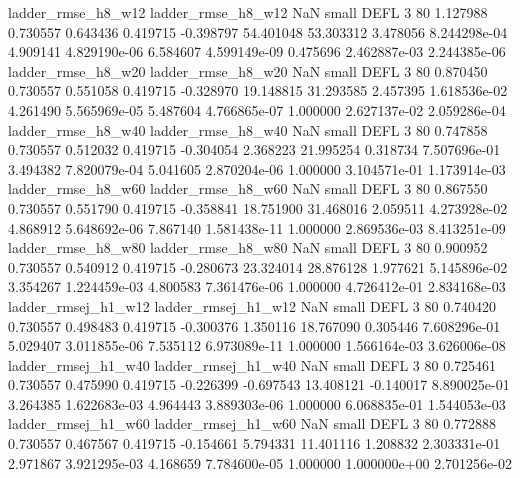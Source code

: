       ladder_rmse_h8_w12       ladder_rmse_h8_w12                   NaN      small     DEFL                 3 80 1.127988       0.730557 0.643436       0.419715   -0.398797     54.401048     53.303312     3.478056   8.244298e-04  4.909141 4.829190e-06     6.584607   4.599149e-09            0.475696    2.462887e-03        2.244385e-06
      ladder_rmse_h8_w20       ladder_rmse_h8_w20                   NaN      small     DEFL                 3 80 0.870450       0.730557 0.551058       0.419715   -0.328970     19.148815     31.293585     2.457395   1.618536e-02  4.261490 5.565969e-05     5.487604   4.766865e-07            1.000000    2.627137e-02        2.059286e-04
      ladder_rmse_h8_w40       ladder_rmse_h8_w40                   NaN      small     DEFL                 3 80 0.747858       0.730557 0.512032       0.419715   -0.304054      2.368223     21.995254     0.318734   7.507696e-01  3.494382 7.820079e-04     5.041605   2.870204e-06            1.000000    3.104571e-01        1.173914e-03
      ladder_rmse_h8_w60       ladder_rmse_h8_w60                   NaN      small     DEFL                 3 80 0.867550       0.730557 0.551790       0.419715   -0.358841     18.751900     31.468016     2.059511   4.273928e-02  4.868912 5.648692e-06     7.867140   1.581438e-11            1.000000    2.869536e-03        8.413251e-09
      ladder_rmse_h8_w80       ladder_rmse_h8_w80                   NaN      small     DEFL                 3 80 0.900952       0.730557 0.540912       0.419715   -0.280673     23.324014     28.876128     1.977621   5.145896e-02  3.354267 1.224459e-03     4.800583   7.361476e-06            1.000000    4.726412e-01        2.834168e-03
     ladder_rmsej_h1_w12      ladder_rmsej_h1_w12                   NaN      small     DEFL                 3 80 0.740420       0.730557 0.498483       0.419715   -0.300376      1.350116     18.767090     0.305446   7.608296e-01  5.029407 3.011855e-06     7.535112   6.973089e-11            1.000000    1.566164e-03        3.626006e-08
     ladder_rmsej_h1_w40      ladder_rmsej_h1_w40                   NaN      small     DEFL                 3 80 0.725461       0.730557 0.475990       0.419715   -0.226399     -0.697543     13.408121    -0.140017   8.890025e-01  3.264385 1.622683e-03     4.964443   3.889303e-06            1.000000    6.068835e-01        1.544053e-03
     ladder_rmsej_h1_w60      ladder_rmsej_h1_w60                   NaN      small     DEFL                 3 80 0.772888       0.730557 0.467567       0.419715   -0.154661      5.794331     11.401116     1.208832   2.303331e-01  2.971867 3.921295e-03     4.168659   7.784600e-05            1.000000    1.000000e+00        2.701256e-02

